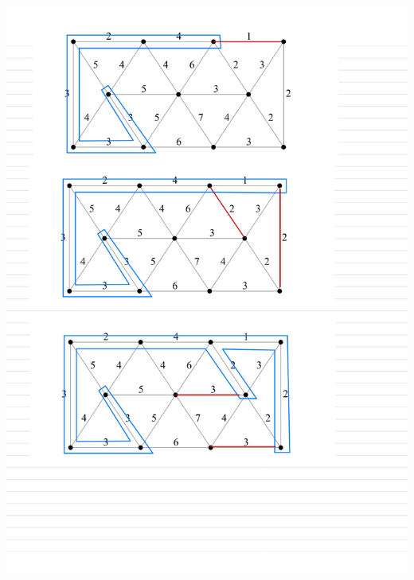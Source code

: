 \documentclass[]{article}
\theoremstyle{definition}
\begin{document}
    \begin{center}
        \includegraphics[width=14cm]{HW1-6.jpg}
    \end{center}
\end{document}
